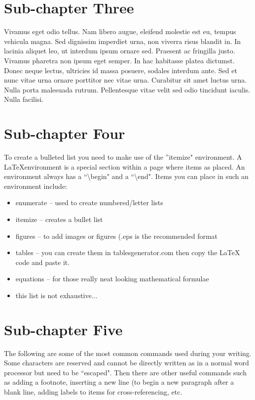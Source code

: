 \begin{spacing}{2.0}
\section{Sub-chapter Three}
Vivamus eget odio tellus. Nam libero augue, eleifend molestie est eu, tempus vehicula magna. Sed dignissim imperdiet urna, non viverra risus blandit in. In lacinia aliquet leo, ut interdum ipsum ornare sed. Praesent ac fringilla justo. Vivamus pharetra non ipsum eget semper. In hac habitasse platea dictumst. Donec neque lectus, ultricies id massa posuere, sodales interdum ante. Sed et nunc vitae urna ornare porttitor nec vitae urna. Curabitur sit amet luctus urna. Nulla porta malesuada rutrum. Pellentesque vitae velit sed odio tincidunt iaculis. Nulla facilisi.

\newpage

\section{Sub-chapter Four}

To create a bulleted list you need to make use of the ''itemize" environment. A \LaTeX environment is a special section within a page where items as placed. An environment always has a ``\textbackslash{begin}" and a ``\textbackslash{end}". Items you can place in such an environment include:
\begin{itemize}
    \item enumerate -- used to create numbered/letter lists
    \item itemize -- creates a bullet list
    \item figures -- to add images or figures (.eps is the recommended format
    \item tables -- you can create them in tablesgenerator.com then copy the \LaTeX\\code and paste it.
    \item equations -- for those really neat looking mathematical formulae
    \item this list is not exhaustive...
\end{itemize}

\newpage
\section{Sub-chapter Five}
The following are some of the most common commands used during your writing. Some characters are reserved and cannot be directly written as in a normal word processor but need to be ``escaped". Then there are other useful commands such as adding a footnote, inserting a new line (to begin a new paragraph after a blank line, adding labels to items for cross-referencing, etc.


\end{spacing}

